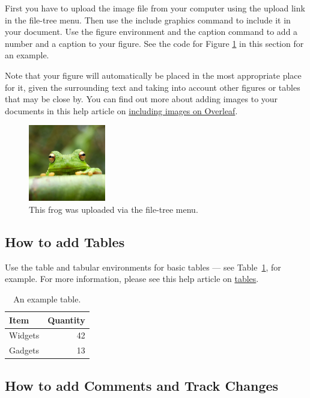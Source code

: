 \documentclass{article}
\begin{document}
First you have to upload the image file from your computer using the upload link in the file-tree menu. Then use the include graphics command to include it in your document. Use the figure environment and the caption command to add a number and a caption to your figure. See the code for Figure \ref{fig:frog} in this section for an example.

Note that your figure will automatically be placed in the most appropriate place for it, given the surrounding text and taking into account other figures or tables that may be close by. You can find out more about adding images to your documents in this help article on \href{https://www.overleaf.com/learn/how-to/Including_images_on_Overleaf}{including images on Overleaf}.
\newpage
\begin{figure}
\centering
\includegraphics[width=0.3\textwidth]{frog.jpg}
\caption{\label{fig:frog}This frog was uploaded via the file-tree menu.}
\end{figure}

\subsection{How to add Tables}

Use the table and tabular environments for basic tables --- see Table~\ref{tab:widgets}, for example. For more information, please see this help article on \href{https://www.overleaf.com/learn/latex/tables}{tables}. 

\begin{table}
\centering
\begin{tabular}{l|r}
Item & Quantity \\\hline
Widgets & 42 \\
Gadgets & 13
\end{tabular}
\caption{\label{tab:widgets}An example table.}
\end{table}

\subsection{How to add Comments and Track Changes}
\end{document}
